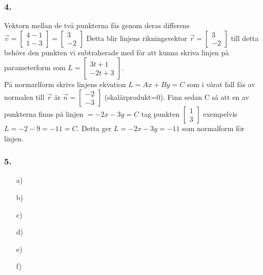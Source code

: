 \documentclass{article}
\begin{document}
\subsubsection*{4.}
Vektorn mellan de två punkterna fås genom deras differens $\vec{v}=\begin{bmatrix} 4-1\\1-3 \end{bmatrix}= \begin{bmatrix} 3\\-2 \end{bmatrix}$ Detta blir linjens rikningsvektor $\vec{r}=\begin{bmatrix} 3\\-2 \end{bmatrix}$ till detta behövs den punkten vi subtraherade med för att kunna skriva linjen på parameterform som $L=\begin{bmatrix} 3t+1 \\-2t+3\end{bmatrix}$.
\\
På normarlform skrivs linjens ekvation $L=Ax+By=C$ som i vårat fall fås av normalen till $\vec{r}$ är $\vec{n}=\begin{bmatrix} -2\\-3 \end{bmatrix}$ (skalärprodukt=0). Finn sedan C så att en av punkterna finns på linjen $=-2x-3y=C$ tag punkten $\begin{bmatrix}1\\3\end{bmatrix}$ exempelvis $L=-2-9=-11=C$. Detta ger $L=-2x-3y=-11$ som normalform för linjen.

\subsubsection*{5.}
\begin{itemize}
\item[a) ] 
\item[b) ] 
\item[c) ] 
\item[d) ] 
\item[e) ] 
\item[f) ] 
\end{itemize}
\end{document}
